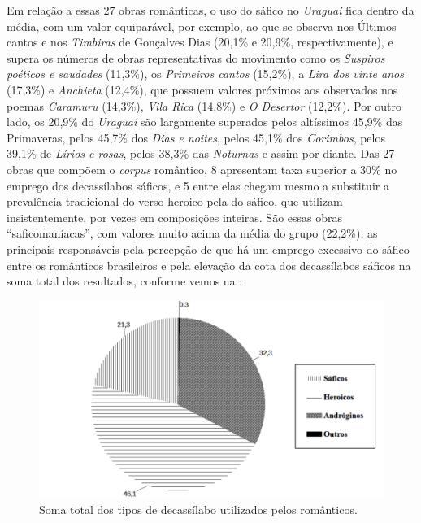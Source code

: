 \documentclass[portuguese]{textolivre}
\begin{document}
Em relação a essas 27 obras românticas, o uso do sáfico no \textit{Uraguai} fica dentro da média, com um valor equiparável, por exemplo, ao que se observa nos Últimos cantos e nos \textit{Timbiras} de Gonçalves Dias (20,1\% e 20,9\%, respectivamente), e supera os números de obras representativas do movimento como os \textit{Suspiros poéticos e saudades} (11,3\%), os \textit{Primeiros cantos} (15,2\%), a \textit{Lira dos vinte anos} (17,3\%) e \textit{Anchieta} (12,4\%), que possuem valores próximos aos observados nos poemas \textit{Caramuru} (14,3\%), \textit{Vila Rica} (14,8\%) e \textit{O Desertor} (12,2\%). Por outro lado, os 20,9\% do \textit{Uraguai} são largamente superados pelos altíssimos 45,9\% das Primaveras, pelos 45,7\% dos \textit{Dias e noites}, pelos 45,1\% dos \textit{Corimbos}, pelos 39,1\% de \textit{Lírios e rosas}, pelos 38,3\% das \textit{Noturnas} e assim por diante. Das 27 obras que compõem o \textit{corpus} romântico, 8 apresentam taxa superior a 30\% no emprego dos decassílabos sáficos, e 5 entre elas chegam mesmo a substituir a prevalência tradicional do verso heroico pela do sáfico, que utilizam insistentemente, por vezes em composições inteiras. São essas obras “saficomaníacas”, com valores muito acima da média do grupo (22,2\%), as principais responsáveis pela percepção de que há um emprego excessivo do sáfico entre os românticos brasileiros e pela elevação da cota dos decassílabos sáficos na soma total dos resultados, conforme vemos na :

\begin{figure}
    \centering
    \begin{minipage}{.75\textwidth}
    \includegraphics[width=\linewidth]{fig-003.pdf}
    \caption{Soma total dos tipos de decassílabo utilizados pelos românticos.}
    \label{fig3}
    \end{minipage}
\end{figure}
\end{document}
